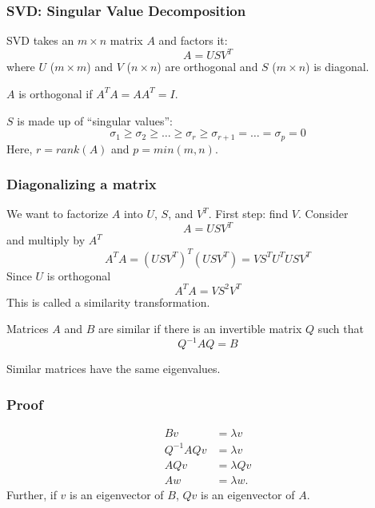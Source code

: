 \documentclass[10pt]{beamer}
\begin{document}
\begin{frame}
\frametitle{SVD: Singular Value Decomposition}
SVD takes an $m \times n$ matrix $A$ and factors it:
\[
    A = U S V^T
\]
where $U$ ($m \times m$) and $V$ ($n \times n$) are orthogonal and $S$ ($m
\times n$) is diagonal.

\begin{definition}
    $A$ is orthogonal if $A^TA=AA^T=I$.
\end{definition}

$S$ is made up of ``singular values'':
\[
    \sigma_1 \geq \sigma_2 \geq \dots \geq \sigma_r \geq \sigma_{r+1} = \dots =
\sigma_p = 0
\]
Here, $r=rank(A)$ and $p=min(m,n)$.
\end{frame}
\begin{frame}
\frametitle{Diagonalizing a matrix}
We want to factorize $A$ into $U$, $S$, and $V^T$.  First step: find $V$.
Consider
\[
    A = U S V^T
\]
and multiply by $A^T$
\[
    A^TA = (USV^T)^T (USV^T) = V S^T U^T U S V^T
\]
Since $U$ is orthogonal
\[
    A^T A = V S^2 V^T
\]
This is called a similarity transformation.
\begin{definition}
    Matrices $A$ and $B$ are similar if there is an invertible matrix $Q$ such
that
\[
Q^{-1} A Q = B
\]
\end{definition}
\begin{theorem}
    Similar matrices have the same eigenvalues.
\end{theorem}
\end{frame}
\begin{frame}
\frametitle{Proof}
\begin{align*}
  B v & = \lambda v\\
  Q^{-1} A Q v &= \lambda v\\
  A Q v &= \lambda Q v\\
  A w   &= \lambda w.
\end{align*}
Further, if $v$ is an eigenvector of $B$, $Qv$ is an eigenvector of $A$.
\end{frame}
\end{document}
